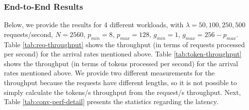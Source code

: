 \subsubsection{End-to-End Results}
Below, we provide the results for 4 different workloads, with $\lambda = 50, 100, 250, 500$ requests/second, $N = 2560$, $p_{min} = 8$, $p_{max} = 128$, $g_{min} = 1 $, $g_{max} = 256 - p_{max}$. Table \ref{tab:req-throughput} shows the throughput (in terms of requests processed per second) for the arrival rates mentioned above. Table \ref{tab:token-throughput} shows the throughput (in terms of tokens processed per second) for the arrival rates mentioned above. We provide two different measurements for the throughput because the requests have different lengths, so it is not possible to simply calculate the tokens/s throughput from the request/s throughput. Next, Table \ref{tab:conv-perf-detail} presents the statistics regarding the latency.

\begin{table}[H]
\caption{Request serving throughput (requests/s) }
\label{tab:req-throughput}
\end{table}

\begin{table}[H]
\caption{Token generation throughput (token/s) }
\label{tab:token-throughput}
\end{table}

